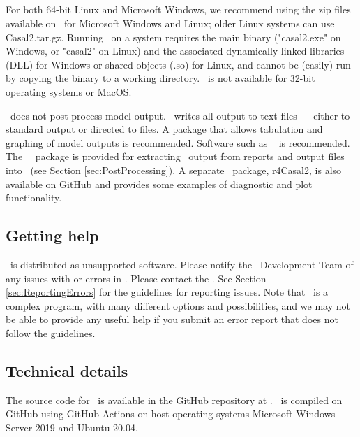 \subsection{}

For both 64-bit Linux and Microsoft Windows, we recommend using the zip files available on \github\ for Microsoft Windows and Linux; older Linux systems can use Casal2.tar.gz. Running \CNAME\ on a system requires the main binary ("casal2.exe" on Windows, or "casal2" on Linux) and the associated dynamically linked libraries (DLL) for Windows or shared objects (.so) for Linux, and cannot be (easily) run by copying the binary to a working directory. \CNAME\ is not available for 32-bit operating systems or MacOS.

\CNAME\ does not post-process model output. \CNAME\ writes all output to text files --- either to standard output or directed to files. A package that allows tabulation and graphing of model outputs is recommended. Software such as \href{http://www.r-project.org}{\R}\ \citep{R} is recommended. The \CNAME\ \R\ package is provided for extracting \CNAME\ output from reports and output files into \R\ (see Section \ref{sec:PostProcessing}). A separate \R\ package, r4Casal2, is also available on GitHub and provides some examples of diagnostic and plot functionality.

\subsection{Getting help}

\CNAME\ is distributed as unsupported software. Please notify the \CNAME\ Development Team of any issues with or errors in \CNAME. Please contact the \emaillink. See Section \ref{sec:ReportingErrors} for the guidelines for reporting issues. Note that \CNAME\ is a complex program, with many different options and possibilities, and we may not be able to provide any useful help if you submit an error report that does not follow the guidelines.

\subsection{Technical details}\label{sec:TechnicalDetails}

The source code for \CNAME\ is available in the GitHub repository at \github. \CNAME\ is compiled on GitHub using GitHub Actions on host operating systems Microsoft Windows Server 2019 and Ubuntu 20.04.

